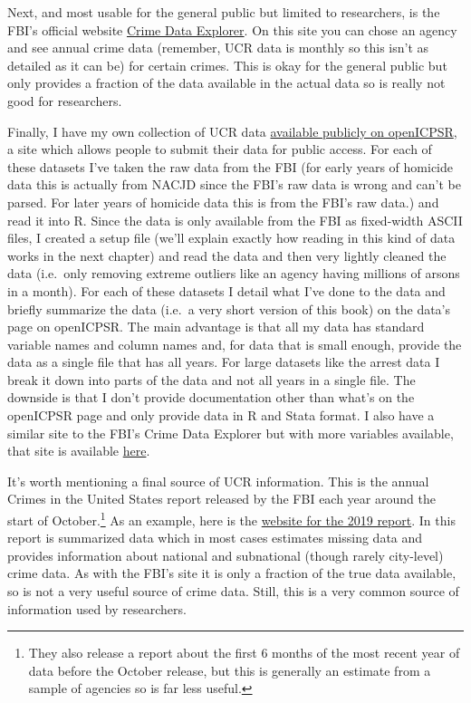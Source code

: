 \documentclass[
  12pt,
  openany]{book}
\begin{document}
Next, and most usable for the general public but limited to researchers, is the FBI's official website \href{https://crime-data-explorer.fr.cloud.gov/}{Crime Data Explorer}. On this site you can chose an agency and see annual crime data (remember, UCR data is monthly so this isn't as detailed as it can be) for certain crimes. This is okay for the general public but only provides a fraction of the data available in the actual data so is really not good for researchers.

Finally, I have my own collection of UCR data \href{https://www.openicpsr.org/openicpsr/search/studies?start=0\&ARCHIVE=openicpsr\&sort=score\%20desc\%2CDATEUPDATED\%20desc\&rows=25\&q=jacob\%20kaplan\%27s\%20concatenated\%20files}{available publicly on openICPSR}, a site which allows people to submit their data for public access. For each of these datasets I've taken the raw data from the FBI (for early years of homicide data this is actually from NACJD since the FBI's raw data is wrong and can't be parsed. For later years of homicide data this is from the FBI's raw data.) and read it into R. Since the data is only available from the FBI as fixed-width ASCII files, I created a setup file (we'll explain exactly how reading in this kind of data works in the next chapter) and read the data and then very lightly cleaned the data (i.e.~only removing extreme outliers like an agency having millions of arsons in a month). For each of these datasets I detail what I've done to the data and briefly summarize the data (i.e.~a very short version of this book) on the data's page on openICPSR. The main advantage is that all my data has standard variable names and column names and, for data that is small enough, provide the data as a single file that has all years. For large datasets like the arrest data I break it down into parts of the data and not all years in a single file. The downside is that I don't provide documentation other than what's on the openICPSR page and only provide data in R and Stata format. I also have a similar site to the FBI's Crime Data Explorer but with more variables available, that site is available \href{jacobdkaplan.com/}{here}.

It's worth mentioning a final source of UCR information. This is the annual Crimes in the United States report released by the FBI each year around the start of October.\footnote{They also release a report about the first 6 months of the most recent year of data before the October release, but this is generally an estimate from a sample of agencies so is far less useful.} As an example, here is the \href{https://ucr.fbi.gov/crime-in-the-u.s/2019/crime-in-the-u.s.-2019}{website for the 2019 report}. In this report is summarized data which in most cases estimates missing data and provides information about national and subnational (though rarely city-level) crime data. As with the FBI's site it is only a fraction of the true data available, so is not a very useful source of crime data. Still, this is a very common source of information used by researchers.
\end{document}
